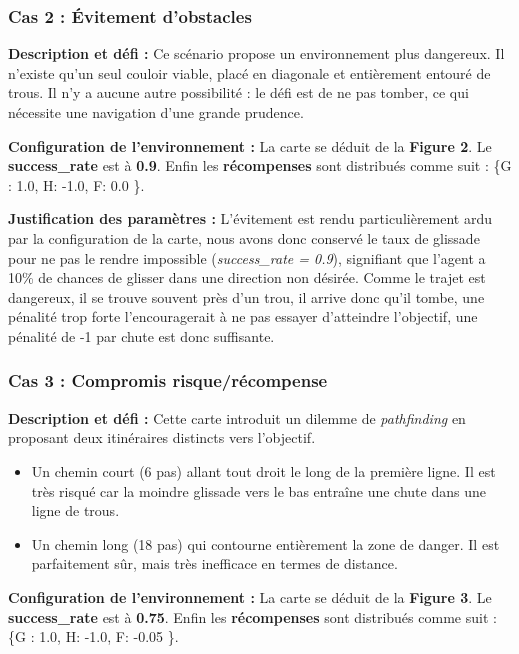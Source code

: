 \documentclass{article}
\begin{document}
\subsubsection{Cas 2 : Évitement d'obstacles}

\textbf{Description et défi :} Ce scénario propose un environnement plus dangereux. Il n'existe qu'un seul couloir viable, placé en diagonale et entièrement entouré de trous. Il n'y a aucune autre possibilité : le défi est de ne pas tomber, ce qui nécessite une navigation d'une grande prudence.

\textbf{Configuration de l'environnement :}
La carte se déduit de la \textbf{Figure 2}. Le \textbf{success\_rate} est à \textbf{0.9}. Enfin les \textbf{récompenses} sont distribués comme suit : \{G : 1.0, H: -1.0, F: 0.0 \}.

\textbf{Justification des paramètres :} L'évitement est rendu particulièrement ardu par la configuration de la carte, nous avons donc conservé le taux de glissade pour ne pas le rendre impossible (\textit{success\_rate = 0.9}), signifiant que l'agent a 10\% de chances de glisser dans une direction non désirée. Comme le trajet est dangereux, il se trouve souvent près d'un trou, il arrive donc qu'il tombe, une pénalité trop forte l'encouragerait à ne pas essayer d'atteindre l'objectif, une pénalité de -1 par chute est donc suffisante.

\subsubsection{Cas 3 : Compromis risque/récompense}

\textbf{Description et défi :} Cette carte introduit un dilemme de \textit{pathfinding} en proposant deux itinéraires distincts vers l'objectif. 
\begin{itemize}
    \item Un chemin court (6 pas) allant tout droit le long de la première ligne. Il est très risqué car la moindre glissade vers le bas entraîne une chute dans une ligne de trous.
    \item Un chemin long (18 pas) qui contourne entièrement la zone de danger. Il est parfaitement sûr, mais très inefficace en termes de distance.
\end{itemize}

\textbf{Configuration de l'environnement :}
La carte se déduit de la \textbf{Figure 3}. Le \textbf{success\_rate} est à \textbf{0.75}. Enfin les \textbf{récompenses} sont distribués comme suit : \{G : 1.0, H: -1.0, F: -0.05 \}.
\end{document}
